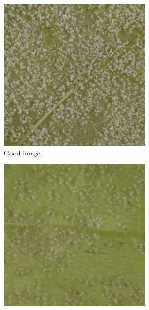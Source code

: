 \documentclass[english]{article}
\begin{document}
\begin{figure}[H]
    \centering
    \begin{subfigure}[b]{0.3\linewidth}
        \includegraphics[width=\linewidth]{Exp21DM02_inoc2_T6_P35_a_4.png}
        \caption{Good image.}\label{fig:issuegood}
    \end{subfigure}
    \begin{subfigure}[b]{0.3\linewidth}
        \includegraphics[width=\linewidth]{Exp20DM01_inoc2_T6_P01_c_3.png}

\end{subfigure}
\end{figure}
\end{document}
